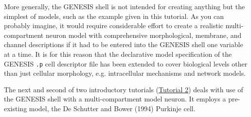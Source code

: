 \documentclass[12pt]{article}
\begin{document}
More generally, the GENESIS shell is not intended for creating anything but the simplest of models, such as the example given in this tutorial.  As you can probably imagine, it would require considerable effort to create a realistic multi-compartment neuron model with comprehensive morphological, membrane, and channel descriptions if it had to be entered into the GENESIS shell one variable at a time. It is for this reason that the declarative model specification of the GENESIS {\tt.p} cell descriptor file has been extended to cover biological levels other than just cellular morphology, e.g. intracellular mechanisms and network models.

The next and second of two introductory tutorials (\href{../tutorial2/tutorial2.tex}{Tutorial 2}) deals with use of the GENESIS shell with a multi-compartment model neuron. It employs a pre-existing model, the De Schutter and Bower (1994) Purkinje cell.

\end{document}
